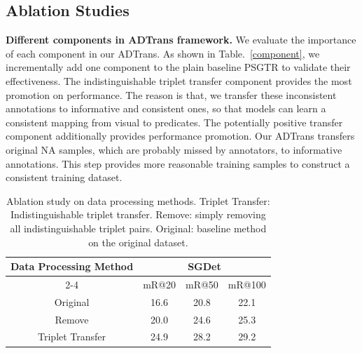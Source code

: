 \documentclass[letterpaper]{article} %
\begin{document}
\subsection{Ablation Studies} 


\noindent\textbf{Different components in ADTrans framework.} We evaluate the importance of each component in our ADTrans. As shown in Table.~\ref{component}, we incrementally add one component to the plain baseline PSGTR \cite{yang2022psg} to validate their effectiveness.
The indistinguishable triplet transfer component provides the most promotion on performance. The reason is that, we transfer these inconsistent annotations to informative and consistent ones, so that models can learn a consistent mapping from visual to predicates.
The potentially positive transfer component additionally provides performance promotion. Our ADTrans transfers original NA samples, which are probably missed by annotators, to informative annotations. This step provides more reasonable training samples to construct a consistent training dataset.






\begin{table}[]

\tabcolsep=0.15cm


\begin{tabular}{c|ccc}
\hline
\multirow{2}{*}{Data Processing Method} & \multicolumn{3}{c}{SGDet}               \\ \cline{2-4} 
                                 & mR@20     & mR@50     & mR@100    \\ \hline
Original                         & 16.6 & 20.8 & 22.1 \\ \hline

Remove                           & 20.0 & 24.6 & 25.3 \\ \hline

Triplet Transfer                 & 24.9 & 28.2 & 29.2 \\ \hline
\end{tabular}
\caption{Ablation study on data processing methods. Triplet Transfer: Indistinguishable triplet transfer. Remove: simply removing all indistinguishable triplet pairs. Original: baseline method on the original dataset.}
\label{TAB:remove}
\end{table}
\end{document}
